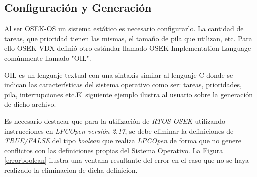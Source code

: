 \documentclass[12pt,letterpaper]{article}
\begin{document}
\subsection{Configuración y Generación}\label{sec:generacionoil}
Al ser OSEK-OS un sistema estático es necesario configurarlo. La cantidad de tareas, que prioridad tienen las mismas, el tamaño de pila que utilizan, etc. Para ello OSEK-VDX definió otro estándar llamado OSEK Implementation Language comúnmente llamado "OIL".

OIL es un lenguaje textual con una sintaxis similar al lenguaje C donde se indican las características del sistema operativo como ser: tareas, prioridades, pila, interrupciones etc.El siguiente ejemplo ilustra al usuario sobre la generación de dicho archivo.

Es necesario destacar que para la utilización de \textit{RTOS OSEK} utilizando instrucciones en \textit{LPCOpen versión 2.17}, se debe eliminar la definiciones de \textit{TRUE/FALSE} del tipo \textit{boolean} que realiza \textit{LPCOpen} de forma que no genere conflictos con las definiciones propias del Sistema Operativo\cite{direccionwebproblemaFALSE}. La Figura \ref{errorboolean} ilustra una ventana resultante del error en el caso que no se haya realizado la eliminacion de dicha definicion.
\end{document}
